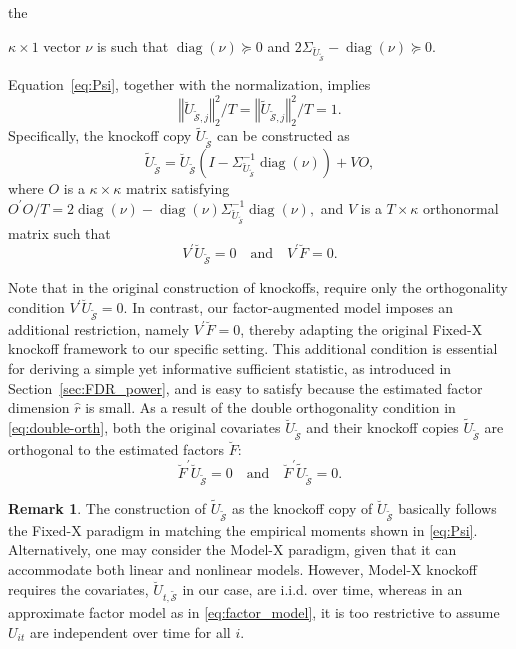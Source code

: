 ﻿\documentclass[12pt]{article}
\newcommand{\0}{\mbox{\bf 0}}
\theoremstyle{plain}%
\newtheorem{remark}{Remark}
\theoremstyle{definition}
\newtheorem{remark}[theorem]{Remark}
\DeclareMathOperator{\diag}{diag}
\begin{document}
the {$\kappa\times 1$ vector $\nu $ is such that $\diag(\nu )\succeq 0$ and $%
2\Sigma _{\breve{U}_{{\widetilde{\mathcal{S}}}}}-\diag(\nu )\succeq 0$. %
\fi




Equation~\eqref{eq:Psi}, together with the normalization, implies
\[
\left\Vert \breve{U}_{\widetilde{\mathcal{S}},j} \right\Vert_2^2/T
=\left\Vert \widetilde{U}_{\widetilde{\mathcal{S}},j} \right\Vert_2^2/T=1.
\]
Specifically, the knockoff copy $\widetilde{U}_{\widetilde{\mathcal{S}}}$ can be constructed as
\begin{equation*}
\widetilde{U}_{\widetilde{\mathcal{S}}} = 
\breve{U}_{\widetilde{\mathcal{S}}} \left( I - \Sigma_{\breve{U}_{\widetilde{\mathcal{S}}}}^{-1} \operatorname{diag}(\nu) \right) 
+ V O,
\end{equation*}
where $O$ is a $\kappa \times \kappa$ matrix satisfying
$
O^{\prime} O/T = 2 \operatorname{diag}(\nu) - \operatorname{diag}(\nu) 
\Sigma_{\breve{U}_{\widetilde{\mathcal{S}}}}^{-1} \operatorname{diag}(\nu),
$
and $V$ is a $T \times \kappa$ orthonormal matrix such that
\begin{equation}
V^{\prime} \breve{U}_{\widetilde{\mathcal{S}}} = 0 
\quad \text{and} \quad 
V^{\prime} \breve{F} = 0. \label{eq:double-orth}
\end{equation}

Note that in the original construction of knockoffs, \citet{BarberCandes2015} require only the orthogonality condition $V^{\prime} \breve{U}_{\widetilde{\mathcal{S}}} = 0$. In contrast, our factor-augmented model imposes an additional restriction, namely $V^{\prime} \breve{F} = 0$, thereby adapting the original Fixed-X knockoff framework to our specific setting. This additional condition is essential for deriving a simple yet informative sufficient statistic, as introduced in Section~\ref{sec:FDR_power}, and is easy to satisfy because the estimated factor dimension $\widehat r$ is small. As a result of the double orthogonality condition in \eqref{eq:double-orth}, both the original covariates $\breve{U}_{\widetilde{\mathcal{S}}}$ and their knockoff copies $\widetilde{U}_{\widetilde{\mathcal{S}}}$ are orthogonal to the estimated factors $\breve{F}$:
\begin{equation}
\breve{F}^{\prime} \breve{U}_{\widetilde{\mathcal{S}}} = 0 
\quad \text{and} \quad 
\breve{F}^{\prime} \widetilde{U}_{\widetilde{\mathcal{S}}} = 0.
\label{eq:double_orthF}
\end{equation}

\begin{remark}
    The construction of $\widetilde{U}_{\widetilde{\mathcal{S}}}$ as the knockoff copy of $\breve{U}_{\widetilde{\mathcal{S}}}$ basically follows the Fixed-X paradigm in matching the empirical moments shown in \eqref{eq:Psi}. Alternatively, one may consider the Model-X paradigm, given that it can accommodate both linear and nonlinear models. However, Model-X knockoff requires the covariates, $\breve{U}_{t,\widetilde{\mathcal{S}}}$ in our case, are i.i.d. over time, whereas in an approximate factor model \citep{BaiNg2002,Bai2003} as in \eqref{eq:factor_model}, it is too restrictive to assume $U_{it}$ are independent over time for all $i$.
\end{remark}

}
\end{document}

